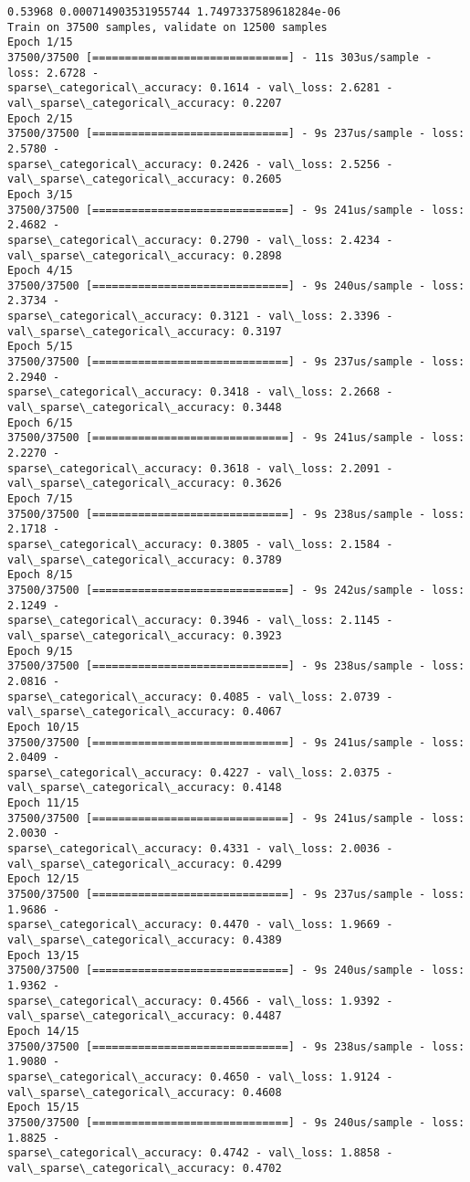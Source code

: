 \documentclass[11pt]{article}
\begin{document}
    \begin{Verbatim}[commandchars=\\\{\}]
0.53968 0.000714903531955744 1.7497337589618284e-06
Train on 37500 samples, validate on 12500 samples
Epoch 1/15
37500/37500 [==============================] - 11s 303us/sample - loss: 2.6728 -
sparse\_categorical\_accuracy: 0.1614 - val\_loss: 2.6281 -
val\_sparse\_categorical\_accuracy: 0.2207
Epoch 2/15
37500/37500 [==============================] - 9s 237us/sample - loss: 2.5780 -
sparse\_categorical\_accuracy: 0.2426 - val\_loss: 2.5256 -
val\_sparse\_categorical\_accuracy: 0.2605
Epoch 3/15
37500/37500 [==============================] - 9s 241us/sample - loss: 2.4682 -
sparse\_categorical\_accuracy: 0.2790 - val\_loss: 2.4234 -
val\_sparse\_categorical\_accuracy: 0.2898
Epoch 4/15
37500/37500 [==============================] - 9s 240us/sample - loss: 2.3734 -
sparse\_categorical\_accuracy: 0.3121 - val\_loss: 2.3396 -
val\_sparse\_categorical\_accuracy: 0.3197
Epoch 5/15
37500/37500 [==============================] - 9s 237us/sample - loss: 2.2940 -
sparse\_categorical\_accuracy: 0.3418 - val\_loss: 2.2668 -
val\_sparse\_categorical\_accuracy: 0.3448
Epoch 6/15
37500/37500 [==============================] - 9s 241us/sample - loss: 2.2270 -
sparse\_categorical\_accuracy: 0.3618 - val\_loss: 2.2091 -
val\_sparse\_categorical\_accuracy: 0.3626
Epoch 7/15
37500/37500 [==============================] - 9s 238us/sample - loss: 2.1718 -
sparse\_categorical\_accuracy: 0.3805 - val\_loss: 2.1584 -
val\_sparse\_categorical\_accuracy: 0.3789
Epoch 8/15
37500/37500 [==============================] - 9s 242us/sample - loss: 2.1249 -
sparse\_categorical\_accuracy: 0.3946 - val\_loss: 2.1145 -
val\_sparse\_categorical\_accuracy: 0.3923
Epoch 9/15
37500/37500 [==============================] - 9s 238us/sample - loss: 2.0816 -
sparse\_categorical\_accuracy: 0.4085 - val\_loss: 2.0739 -
val\_sparse\_categorical\_accuracy: 0.4067
Epoch 10/15
37500/37500 [==============================] - 9s 241us/sample - loss: 2.0409 -
sparse\_categorical\_accuracy: 0.4227 - val\_loss: 2.0375 -
val\_sparse\_categorical\_accuracy: 0.4148
Epoch 11/15
37500/37500 [==============================] - 9s 241us/sample - loss: 2.0030 -
sparse\_categorical\_accuracy: 0.4331 - val\_loss: 2.0036 -
val\_sparse\_categorical\_accuracy: 0.4299
Epoch 12/15
37500/37500 [==============================] - 9s 237us/sample - loss: 1.9686 -
sparse\_categorical\_accuracy: 0.4470 - val\_loss: 1.9669 -
val\_sparse\_categorical\_accuracy: 0.4389
Epoch 13/15
37500/37500 [==============================] - 9s 240us/sample - loss: 1.9362 -
sparse\_categorical\_accuracy: 0.4566 - val\_loss: 1.9392 -
val\_sparse\_categorical\_accuracy: 0.4487
Epoch 14/15
37500/37500 [==============================] - 9s 238us/sample - loss: 1.9080 -
sparse\_categorical\_accuracy: 0.4650 - val\_loss: 1.9124 -
val\_sparse\_categorical\_accuracy: 0.4608
Epoch 15/15
37500/37500 [==============================] - 9s 240us/sample - loss: 1.8825 -
sparse\_categorical\_accuracy: 0.4742 - val\_loss: 1.8858 -
val\_sparse\_categorical\_accuracy: 0.4702
    \end{Verbatim}
\end{document}
